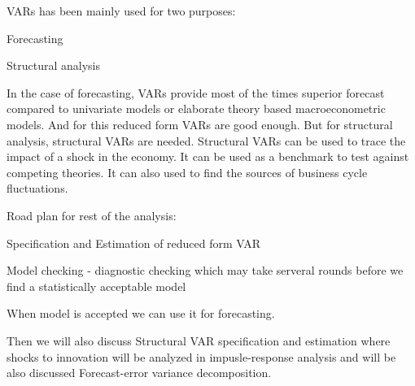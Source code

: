VARs has been mainly used for two purposes:

Forecasting

Structural analysis

In the case of forecasting, VARs provide most of the times superior forecast compared to univariate models or elaborate theory based macroeconometric models. And for this reduced form VARs are good enough. But for structural analysis, structural VARs are needed. Structural VARs can be used to trace the impact of a shock in the economy. It can be used as a benchmark to test against competing theories. It can also used to find the sources of business cycle fluctuations.

Road plan for rest of the analysis:

Specification and Estimation of reduced form VAR

Model checking - diagnostic checking which may take serveral rounds before we find a statistically acceptable model

When model is accepted we can use it for forecasting. 

Then we will also discuss Structural VAR specification and estimation where shocks to innovation will be analyzed in impusle-response analysis and will be also discussed Forecast-error variance decomposition. 